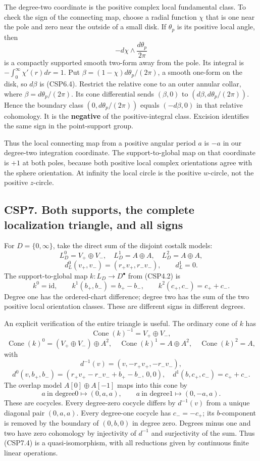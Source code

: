 The degree-two coordinate is the positive complex local fundamental
class. To check the sign of the connecting map, choose a radial function
\(\chi\) that is one near the pole and zero near the outside of a small
disk. If \(\theta_p\) is its positive local angle, then \[
-d\chi\wedge\frac{d\theta_p}{2\pi}
\tag{CSP6.4}
\] is a compactly supported smooth two-form away from the pole. Its
integral is \(-\int_0^\infty\chi'(r)dr=1\). Put
\(\beta=(1-\chi)d\theta_p/(2\pi)\), a smooth one-form on the disk, so
\(d\beta\) is (CSP6.4). Restrict the relative cone to an outer annular
collar, where \(\beta=d\theta_p/(2\pi)\). Its cone differential sends
\((\beta,0)\) to \((d\beta,d\theta_p/(2\pi))\). Hence the boundary class
\((0,d\theta_p/(2\pi))\) equals \((-d\beta,0)\) in that relative
cohomology. It is the \textbf{negative} of the positive-integral class.
Excision identifies the same sign in the point-support group.

Thus the local connecting map from a positive angular period \(a\) is
\(-a\) in our degree-two integration coordinate. The support-to-global
map on that coordinate is \(+1\) at both poles, because both positive
local complex orientations agree with the sphere orientation. At
infinity the local circle is the positive \(w\)-circle, not the positive
\(z\)-circle.

\subsection{CSP7. Both supports, the complete localization triangle, and
all
signs}\label{csp7.-both-supports-the-complete-localization-triangle-and-all-signs}

For \(D=\{0,\infty\}\), take the direct sum of the disjoint costalk
models: \[
L_D^0=V_+\oplus V_-,\quad
L_D^1=A\oplus A,\quad L_D^2=A\oplus A,
\] \[
d_L^0(v_+,v_-)=(r_+v_+,r_-v_-),\qquad d_L^1=0.
\tag{CSP7.1}
\] The support-to-global map \(k:L_D\to D^\bullet\) from (CSP4.2) is \[
k^0=\mathrm{id},\qquad
k^1(b_+,b_-)=b_+-b_-,\qquad
k^2(c_+,c_-)=c_++c_-.
\tag{CSP7.2}
\] Degree one has the ordered-chart difference; degree two has the sum
of the two positive local orientation classes. These are different signs
in different degrees.

An explicit verification of the entire triangle is useful. The ordinary
cone of \(k\) has \[
\operatorname{Cone}(k)^{-1}=V_+\oplus V_-,
\] \[
\operatorname{Cone}(k)^0=(V_+\oplus V_-)\oplus A^2,\quad
\operatorname{Cone}(k)^1=A\oplus A^2,\quad
\operatorname{Cone}(k)^2=A,
\] with \[
d^{-1}(v)=(v,-r_+v_+,-r_-v_-),
\] \[
d^0(v,b_+,b_-)=(r_+v_+-r_-v_-+b_+-b_-,\,0,0),
\quad
d^1(b,c_+,c_-)=c_++c_-.
\tag{CSP7.3}
\] The overlap model \(A[0]\oplus A[-1]\) maps into this cone by \[
a\ \text{in degree0}\longmapsto (0,a,a),\qquad
a\ \text{in degree1}\longmapsto (0,-a,a).
\tag{CSP7.4}
\] These are cocycles. Every degree-zero cocycle differs by
\(d^{-1}(v)\) from a unique diagonal pair \((0,a,a)\). Every degree-one
cocycle has \(c_-=-c_+\); its \(b\)-component is removed by the boundary
of \((0,b,0)\) in degree zero. Degrees minus one and two have zero
cohomology by injectivity of \(d^{-1}\) and surjectivity of the sum.
Thus (CSP7.4) is a quasi-isomorphism, with all reductions given by
continuous finite linear operations.

